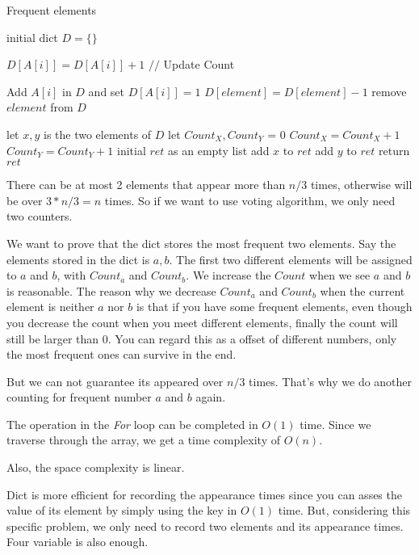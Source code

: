 \begin{algorithm}[]
  \caption{Frequent elements}
  initial dict $D = \{\}$ \;
  {
    {
        
        $D[A[i]] = D[A[i]] + 1 $ $//$ Update Count\;
    }
    \Else
    {
        {
            Add $A[i]$ in $D$ and set $D[A[i]] = 1$\;
        }
        \Else
        {
            {
                $D[element] = D[element] - 1$\;
                {
                    remove $element$ from $D$\;
                }
            }
        }
    }
  }
  let $x, y$ is the two elements of $D$\;
  let $Count_X, Count_Y$ = 0 \;
  {
    {
        $Count_X = Count_X+1$\;
    }
    {
        $Count_Y = Count_Y+1$\;
    }
  }
  initial $ret$ as an empty list \;
  {
    add $x$ to $ret$\;
  }
  {
    add $y$ to $ret$\;
  }
  return $ret$\;
\end{algorithm}


There can be at most 2 elements that appear more than $n/3$ times, otherwise will be over $3*n/3=n$ times. So if we want to use voting algorithm, we only need two counters.

We want to prove that the dict stores the most frequent two elements. Say the elements stored in the dict is $a, b$. The first two different elements will be assigned to $a$ and $b$, with $Count_a$ and $Count_b$. We increase the $Count$ when we see $a$ and $b$ is reasonable. The reason why we decrease $Count_a$ and $Count_b$ when the current element is neither $a$ nor $b$ is that if you have some frequent elements, even though you decrease the count when you meet different elements, finally the count will still be larger than 0. You can regard this as a offset of different numbers, only the most frequent ones can survive in the end.

But we can not guarantee its appeared over $n/3$ times. That's why we do another counting for frequent number $a$ and $b$ again.


The operation in the \textit{For} loop can be completed in $O(1)$ time. Since we traverse through the array, we get a time complexity of $O(n)$.

Also, the space complexity is linear.


Dict is more efficient for recording the appearance times since you can asses the value of its element by simply using the key in $O(1)$ time. But, considering this specific problem, we only need to record two elements and its appearance times. Four variable is also enough.